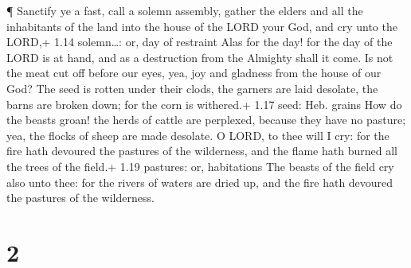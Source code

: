  ¶ Sanctify ye a fast, call a solemn assembly, gather the
elders and all the inhabitants of the land into the house of the LORD
your God, and cry unto the LORD,+ 1.14 solemn\ldots: or, day of
restraint  Alas for the day! for the day of the LORD is at
hand, and as a destruction from the Almighty shall it come.
 Is not the meat cut off before our eyes, yea, joy and
gladness from the house of our God?  The seed is rotten
under their clods, the garners are laid desolate, the barns are broken
down; for the corn is withered.+ 1.17 seed: Heb. grains 
How do the beasts groan! the herds of cattle are perplexed, because they
have no pasture; yea, the flocks of sheep are made desolate.
 O LORD, to thee will I cry: for the fire hath devoured the
pastures of the wilderness, and the flame hath burned all the trees of
the field.+ 1.19 pastures: or, habitations  The beasts of
the field cry also unto thee: for the rivers of waters are dried up, and
the fire hath devoured the pastures of the wilderness.

\hypertarget{section-1}{%
\section{2}\label{section-1}}

